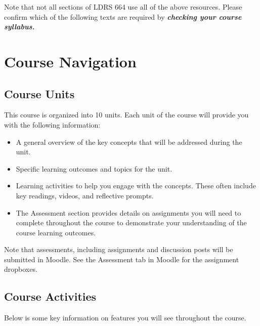 \documentclass[
]{book}
\providecommand{\tightlist}{%
  \setlength{\itemsep}{0pt}\setlength{\parskip}{0pt}}
\begin{document}
\begin{caution}
Note that not all sections of LDRS 664 use all of the above resources.
Please confirm which of the following texts are required by
\textbf{\emph{checking your course syllabus.}}
\end{caution}

\hypertarget{course-navigation}{%
\section*{Course Navigation}\label{course-navigation}}

\hypertarget{course-units}{%
\subsection*{Course Units}\label{course-units}}

This course is organized into 10 units. Each unit of the course will provide you with the following information:

\begin{itemize}
\tightlist
\item
  A general overview of the key concepts that will be addressed during the unit.
\item
  Specific learning outcomes and topics for the unit.
\item
  Learning activities to help you engage with the concepts. These often include key readings, videos, and reflective prompts.
\item
  The Assessment section provides details on assignments you will need to complete throughout the course to demonstrate your understanding of the course learning outcomes.
\end{itemize}

\begin{caution}
 Note that assessments, including assignments and discussion posts will
 be submitted in Moodle. See the Assessment tab in Moodle for the
 assignment dropboxes.
 \end{caution}

\hypertarget{course-activities}{%
\subsection*{Course Activities}\label{course-activities}}

Below is some key information on features you will see throughout the course.~
\end{document}

